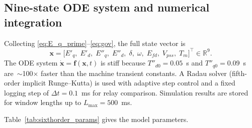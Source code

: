 \documentclass[journal,twoside,letterpaper]{IEEEtran}
\newcommand{\vect}[1]{\bm{#1}}
\begin{document}
\subsection{Nine-state ODE system and numerical integration}

Collecting \eqref{eq:E_q_prime}--\eqref{eq:gov}, the
full state vector is
\begin{equation}
  \vect{x} = \bigl[E'_q,\;E'_d,\;E''_q,\;E''_d,\;
                   \delta,\;\omega,\;E_{fd},\;V_{pss},\;T_m
             \bigr]^\top \in \mathbb{R}^9.
\label{eq:state_vector}
\end{equation}
The ODE system $\dot{\vect{x}} = \vect{f}(\vect{x},t)$ is
stiff because $T''_{d0} = 0.05$~s and $T''_{q0} = 0.09$~s
are~$\sim$100$\times$ faster than the machine transient
constants.
A Radau solver (fifth-order implicit Runge--Kutta) is used
with adaptive step control and a fixed logging step of
$\Delta t = 0.1$~ms for relay comparison.
Simulation results are stored for window lengths up to
$L_{\max} = 500$~ms.

Table~\ref{tab:sixthorder_params} gives the model parameters.
\end{document}

